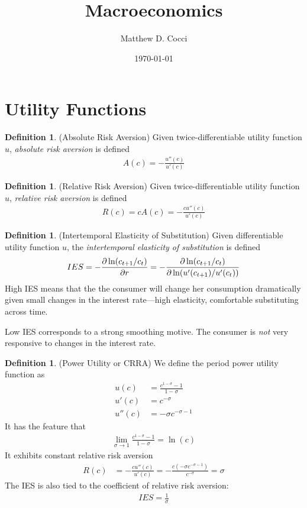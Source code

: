 \documentclass[12pt]{article}
\author{Matthew D. Cocci}
\title{Macroeconomics}
\date{\today}
\theoremstyle{plain}
\theoremstyle{definition}
\newtheorem{defn}[thm]{Definition}
\theoremstyle{remark}
\newcommand{\ra}{\rightarrow}
\begin{document}
\maketitle


\section{Utility Functions}

\begin{defn}(Absolute Risk Aversion)
Given twice-differentiable utility function $u$,
\emph{absolute risk aversion} is defined
\begin{align*}
  A(c) = -\frac{u''(c)}{u'(c)}
\end{align*}
\end{defn}

\begin{defn}(Relative Risk Aversion)
Given twice-differentiable utility function $u$,
\emph{relative risk aversion} is defined
\begin{align*}
  R(c) = cA(c) = -\frac{c u''(c)}{u'(c)}
\end{align*}
\end{defn}

\begin{defn}(Intertemporal Elasticity of Substitution)
Given differentiable utility function $u$,
the \emph{intertemporal elasticity of substitution} is defined
\begin{align*}
  IES
  = -\frac{\partial \ln(c_{t+1}/c_t)}{\partial r}
  = -\frac{\partial \ln(c_{t+1}/c_t)}{%
    \partial \ln(u'(c_{t+1})/u'(c_t))}
\end{align*}
High IES means that the the consumer will change her consumption
dramatically given small changes in the interest rate---high elasticity,
comfortable substituting across time.

Low IES corresponds to a strong smoothing motive. The consumer is
\emph{not} very responsive to changes in the interest rate.
\end{defn}

\begin{defn}(Power Utility or CRRA)
We define the period power utility function as
\begin{align*}
  u(c) &= \frac{c^{1-\sigma}-1}{1-\sigma} \\
  u'(c) &= c^{-\sigma} \\
  u''(c) &= -\sigma c^{-\sigma-1}
\end{align*}
It has the feature that
\begin{align*}
  \lim_{\sigma\ra 1}
  \frac{c^{1-\sigma}-1}{1-\sigma}
  = \ln(c)
\end{align*}
It exhibits constant relative risk aversion
\begin{align*}
  R(c) &=
  -\frac{c u''(c)}{u'(c)}
  = -\frac{c (-\sigma c^{-\sigma-1})}{c^{-\sigma}}
  = \sigma
\end{align*}
The IES is also tied to the coefficient of relative risk aversion:
\begin{align*}
  IES
  = \frac{1}{\sigma}
\end{align*}
\end{defn}
\end{document}
